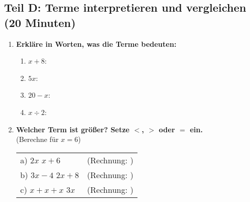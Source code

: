 \subsection*{Teil D: Terme interpretieren und vergleichen (20 Minuten)}

\begin{enumerate}[label=\arabic*., resume]

    \item \textbf{Erkläre in Worten, was die Terme bedeuten:}

    \vspace{0.5cm}

    \begin{enumerate}[label=\alph*)]
        \item $x + 8$: \underline{\hspace{8cm}}
        \vspace{0.5cm}
        \item $5x$: \underline{\hspace{8cm}}
        \vspace{0.5cm}
        \item $20 - x$: \underline{\hspace{8cm}}
        \vspace{0.5cm}
        \item $x \div 2$: \underline{\hspace{8cm}}
    \end{enumerate}

    \vspace{1cm}

    \item \textbf{Welcher Term ist größer? Setze $<$, $>$ oder $=$ ein.} \\
    (Berechne für $x = 6$)

    \vspace{0.5cm}

    \begin{tabular}{ll}
        a) $2x$ \phantom{$=$} $x + 6$ & (Rechnung: \underline{\hspace{4cm}}) \\[2ex]
        b) $3x - 4$ \phantom{$=$} $2x + 8$ & (Rechnung: \underline{\hspace{4cm}}) \\[2ex]
        c) $x + x + x$ \phantom{$=$} $3x$ & (Rechnung: \underline{\hspace{4cm}})
    \end{tabular}

    \vspace{1cm}


\end{enumerate}
